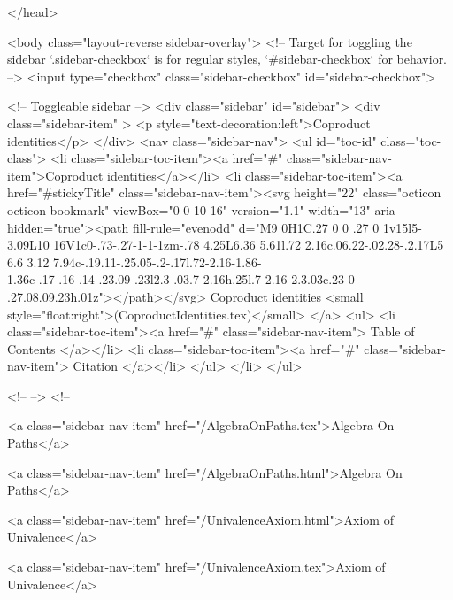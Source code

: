 </head>


  <body class="layout-reverse sidebar-overlay">
    <!-- Target for toggling the sidebar `.sidebar-checkbox` is for regular
     styles, `#sidebar-checkbox` for behavior. -->
<input type="checkbox" class="sidebar-checkbox" id="sidebar-checkbox">

<!-- Toggleable sidebar -->
<div class="sidebar" id="sidebar">
  <div class="sidebar-item" >
    <p style="text-decoration:left">Coproduct identities</p>
  </div>
  <nav class="sidebar-nav">
    <ul id="toc-id" class="toc-class">
  <li class="sidebar-toc-item"><a href="#" class="sidebar-nav-item">Coproduct identities</a></li>
  <li class="sidebar-toc-item"><a href="#stickyTitle" class="sidebar-nav-item"><svg height="22" class="octicon octicon-bookmark" viewBox="0 0 10 16" version="1.1" width="13" aria-hidden="true"><path fill-rule="evenodd" d="M9 0H1C.27 0 0 .27 0 1v15l5-3.09L10 16V1c0-.73-.27-1-1-1zm-.78 4.25L6.36 5.61l.72 2.16c.06.22-.02.28-.2.17L5 6.6 3.12 7.94c-.19.11-.25.05-.2-.17l.72-2.16-1.86-1.36c-.17-.16-.14-.23.09-.23l2.3-.03.7-2.16h.25l.7 2.16 2.3.03c.23 0 .27.08.09.23h.01z"></path></svg> Coproduct identities <small style="float:right">(CoproductIdentities.tex)</small>
</a>
    <ul>
      <li class="sidebar-toc-item"><a href="#" class="sidebar-nav-item"> Table of Contents </a></li>
      <li class="sidebar-toc-item"><a href="#" class="sidebar-nav-item"> Citation </a></li>
    </ul>
  </li>
</ul>


    <!--  -->
    <!-- 
      
    
      
    
      
    
      
        
      
    
      
        
          <a class="sidebar-nav-item" href="/AlgebraOnPaths.tex">Algebra On Paths</a>
        
      
    
      
        
          <a class="sidebar-nav-item" href="/AlgebraOnPaths.html">Algebra On Paths</a>
        
      
    
      
        
          <a class="sidebar-nav-item" href="/UnivalenceAxiom.html">Axiom of Univalence</a>
        
      
    
      
        
          <a class="sidebar-nav-item" href="/UnivalenceAxiom.tex">Axiom of Univalence</a>
        
